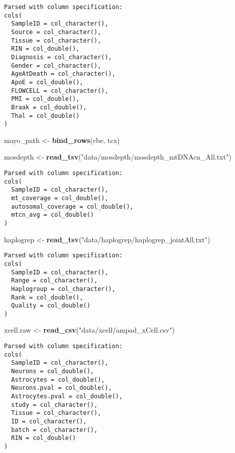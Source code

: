 \documentclass[]{book}
\newenvironment{Shaded}{\begin{snugshade}}{\end{snugshade}}
\newcommand{\KeywordTok}[1]{\textcolor[rgb]{0.13,0.29,0.53}{\textbf{#1}}}
\newcommand{\NormalTok}[1]{#1}
\newcommand{\StringTok}[1]{\textcolor[rgb]{0.31,0.60,0.02}{#1}}
\begin{document}
\begin{verbatim}
Parsed with column specification:
cols(
  SampleID = col_character(),
  Source = col_character(),
  Tissue = col_character(),
  RIN = col_double(),
  Diagnosis = col_character(),
  Gender = col_character(),
  AgeAtDeath = col_character(),
  ApoE = col_double(),
  FLOWCELL = col_character(),
  PMI = col_double(),
  Braak = col_double(),
  Thal = col_double()
)
\end{verbatim}

\begin{Shaded}
\begin{Highlighting}[]
\NormalTok{mayo_path <-}\StringTok{ }\KeywordTok{bind_rows}\NormalTok{(cbe, tcx)}

\NormalTok{mosdepth <-}\StringTok{ }\KeywordTok{read_tsv}\NormalTok{(}\StringTok{"data/mosdepth/mosdepth_mtDNAcn_All.txt"}\NormalTok{)}
\end{Highlighting}
\end{Shaded}

\begin{verbatim}
Parsed with column specification:
cols(
  SampleID = col_character(),
  mt_coverage = col_double(),
  autosomal_coverage = col_double(),
  mtcn_avg = col_double()
)
\end{verbatim}

\begin{Shaded}
\begin{Highlighting}[]
\NormalTok{haplogrep <-}\StringTok{ }\KeywordTok{read_tsv}\NormalTok{(}\StringTok{"data/haplogrep/haplogrep_jointAll.txt"}\NormalTok{)}
\end{Highlighting}
\end{Shaded}

\begin{verbatim}
Parsed with column specification:
cols(
  SampleID = col_character(),
  Range = col_character(),
  Haplogroup = col_character(),
  Rank = col_double(),
  Quality = col_double()
)
\end{verbatim}

\begin{Shaded}
\begin{Highlighting}[]
\NormalTok{xcell.raw <-}\StringTok{ }\KeywordTok{read_csv}\NormalTok{(}\StringTok{"data/xcell/ampad_xCell.csv"}\NormalTok{) }
\end{Highlighting}
\end{Shaded}

\begin{verbatim}
Parsed with column specification:
cols(
  SampleID = col_character(),
  Neurons = col_double(),
  Astrocytes = col_double(),
  Neurons.pval = col_double(),
  Astrocytes.pval = col_double(),
  study = col_character(),
  Tissue = col_character(),
  ID = col_character(),
  batch = col_character(),
  RIN = col_double()
)
\end{verbatim}
\end{document}
